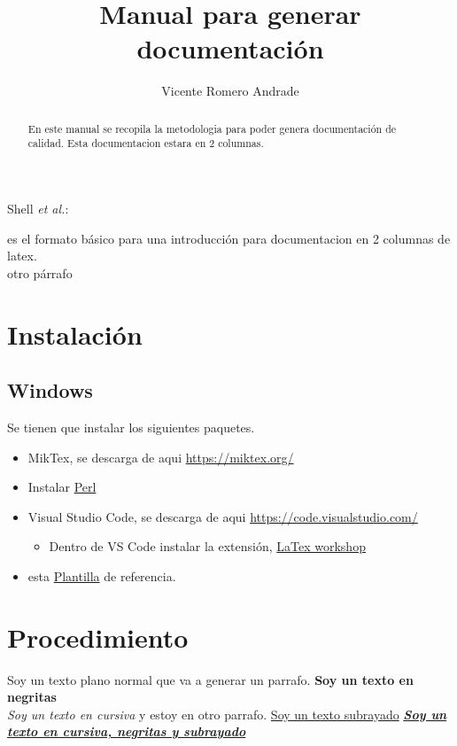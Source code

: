 \documentclass[journal]{IEEEtran}
\begin{document}
\title{Manual para generar documentación}

\author{Vicente Romero Andrade}

{Shell \MakeLowercase{\textit{et al.}}: }

\maketitle

\tableofcontents
\begin{abstract}
En este manual se recopila la metodologia para poder genera documentación de calidad.
Esta documentacion estara en 2 columnas.
\end{abstract}

\IEEEpeerreviewmaketitle


 es el formato básico para una 
introducción para documentacion en 2 columnas de latex.\\otro párrafo

\section{Instalación}
\subsection{Windows}
Se tienen que instalar los siguientes paquetes.
\begin{itemize}
    \item MikTex, se descarga de aqui \url{https://miktex.org/}
    \item Instalar \href{https://www.activestate.com/products/perl/downloads/}{Perl}
    \item Visual Studio Code, se descarga de aqui \url{https://code.visualstudio.com/}
    \begin{itemize}
        \item Dentro de VS Code instalar la extensión, \href{https://marketplace.visualstudio.com/items?itemName=James-Yu.latex-workshop}{LaTex workshop}
    \end{itemize}
    \item esta \href{https://github.com/ValdrST/Plantilla-LaTeX}{Plantilla} de referencia.
\end{itemize}

\section{Procedimiento}
Soy un texto plano normal que va a generar un parrafo. 
\textbf{Soy un texto en negritas}
\\ 
\textit{Soy un texto en cursiva} y estoy en otro parrafo. \underline{Soy un texto subrayado}
\underline{\textit{\textbf{Soy un texto en cursiva, negritas y subrayado}}}  
\end{document}
